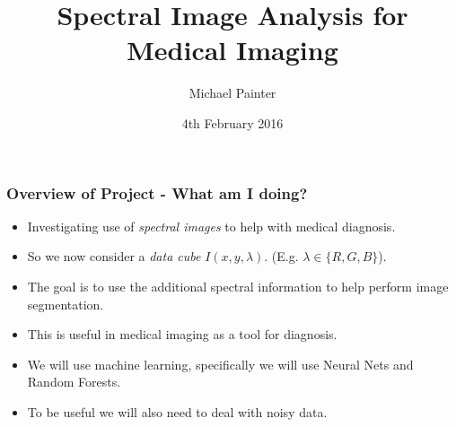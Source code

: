 \documentclass{beamer}
\title[Short title]{Spectral Image Analysis for \\Medical Imaging} %
\author{Michael Painter} %
\institute[UoC] %
{
University of Cambridge \\ %
\medskip
\textit{mp703@cam.ac.uk} %
}
\date{4th February 2016} %
\begin{document}
\begin{frame}
    \titlepage %
\end{frame}


\begin{frame}
    \frametitle{Overview of Project - What am I doing?}

    \begin{itemize}
        \item Investigating use of \textit{spectral images} to help with medical diagnosis.
        \item So we now consider a \textit{data cube} $I(x,y,\lambda)$. (E.g. $\lambda \in \{R, G, B\}$).
        \item The goal is to use the additional spectral information to help perform image segmentation.
        \item This is useful in medical imaging as a tool for diagnosis.
        \item We will use machine learning, specifically we will use Neural Nets and Random Forests.
        \item To be useful we will also need to deal with noisy data.
    \end{itemize}
\end{frame}

\end{document}
